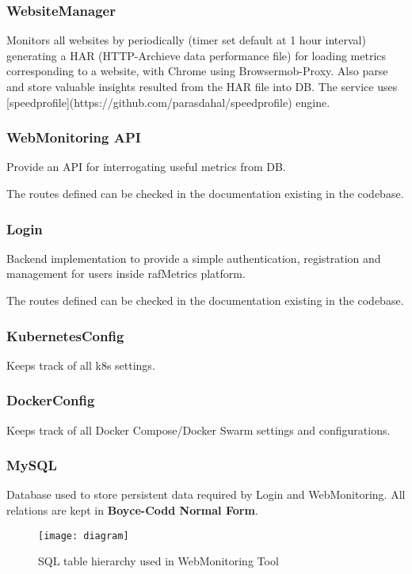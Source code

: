 \subsubsection{WebsiteManager}
Monitors all websites by periodically (timer set default at 1 hour interval) generating a HAR (HTTP-Archieve data performance file) for loading metrics corresponding to a website, with Chrome using Browsermob-Proxy.
Also parse and store valuable insights resulted from the HAR file into DB.
The service uses [speedprofile](https://github.com/parasdahal/speedprofile) engine.

\subsubsection{WebMonitoring API}
Provide an API for interrogating useful metrics from DB.

The routes defined can be checked in the documentation existing in the codebase.

\subsubsection{Login}
Backend implementation to provide a simple authentication, registration and management for users inside rafMetrics platform.

The routes defined can be checked in the documentation existing in the codebase.

\subsubsection{KubernetesConfig}
Keeps track of all k8s settings.

\subsubsection{DockerConfig}
Keeps track of all Docker Compose/Docker Swarm settings and configurations.

\subsubsection{MySQL}
Database used to store persistent data required by Login and WebMonitoring.
All relations are kept in \textbf{Boyce-Codd Normal Form}.

\begin{figure}[H]
    \centering
    \texttt{[image: diagram]}
    \caption{SQL table hierarchy used in WebMonitoring Tool}
\end{figure}

